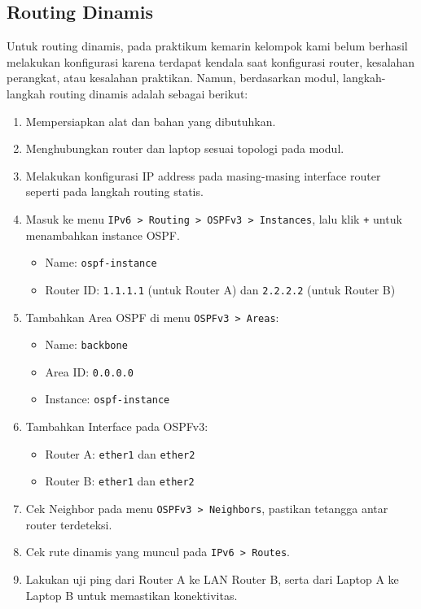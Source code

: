 \subsection{Routing Dinamis}
Untuk routing dinamis, pada praktikum kemarin kelompok kami belum berhasil melakukan konfigurasi karena terdapat kendala saat konfigurasi router, kesalahan perangkat, atau kesalahan praktikan. Namun, berdasarkan modul, langkah-langkah routing dinamis adalah sebagai berikut:

\begin{enumerate}
    \item Mempersiapkan alat dan bahan yang dibutuhkan.
    \item Menghubungkan router dan laptop sesuai topologi pada modul.
    \item Melakukan konfigurasi IP address pada masing-masing interface router seperti pada langkah routing statis.
    \item Masuk ke menu \texttt{IPv6 > Routing > OSPFv3 > Instances}, lalu klik \texttt{+} untuk menambahkan instance OSPF.
    \begin{itemize}
        \item Name: \texttt{ospf-instance}
        \item Router ID: \texttt{1.1.1.1} (untuk Router A) dan \texttt{2.2.2.2} (untuk Router B)
    \end{itemize}
    \item Tambahkan Area OSPF di menu \texttt{OSPFv3 > Areas}:
    \begin{itemize}
        \item Name: \texttt{backbone}
        \item Area ID: \texttt{0.0.0.0}
        \item Instance: \texttt{ospf-instance}
    \end{itemize}
    \item Tambahkan Interface pada OSPFv3:
    \begin{itemize}
        \item Router A: \texttt{ether1} dan \texttt{ether2}
        \item Router B: \texttt{ether1} dan \texttt{ether2}
    \end{itemize}
    \item Cek Neighbor pada menu \texttt{OSPFv3 > Neighbors}, pastikan tetangga antar router terdeteksi.
    \item Cek rute dinamis yang muncul pada \texttt{IPv6 > Routes}.
    \item Lakukan uji ping dari Router A ke LAN Router B, serta dari Laptop A ke Laptop B untuk memastikan konektivitas.
\end{enumerate}




